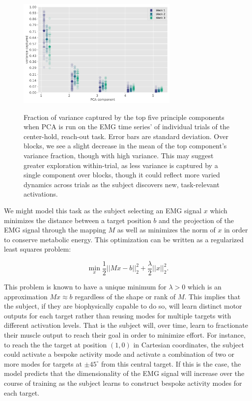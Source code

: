 \begin{figure}
\label{fig:PCA_trial_variance}
\centering
\includegraphics[width=0.7\textwidth,height=\textheight]{images/data_analysis/center_hold/PCA_trial_variance.pdf}
\caption{Fraction of variance captured by the top five principle
components when PCA is run on the EMG time series' of individual trials
of the center-hold, reach-out task. Error bars are standard deviation.
Over blocks, we see a slight decrease in the mean of the top component's
variance fraction, though with high variance. This may suggest greater
exploration within-trial, as less variance is captured by a single
component over blocks, though it could reflect more varied dynamics
across trials as the subject discovers new, task-relevant
activations.}\label{fig:PCA_trial_variance}
\end{figure}

We might model this task as the subject selecting an EMG signal \(x\)
which minimizes the distance between a target position \(b\) and the
projection of the EMG signal through the mapping \(M\) as well as
minimizes the norm of \(x\) in order to conserve metabolic energy. This
optimization can be written as a regularized least squares problem:

\[
\min_x\frac{1}{2}||Mx - b||^2_2 + \frac{\lambda}{2}||x||_2^2.
\]

This problem is known to have a unique minimum for \(\lambda>0\) which
is an approximation \(Mx\approx b\) regardless of the shape or rank of
\(M\). This implies that the subject, if they are biophysically capable
to do so, will learn distinct motor outputs for each target rather than
reusing modes for multiple targets with different activation levels.
That is the subject will, over time, learn to fractionate their muscle
output to reach their goal in order to minimize effort. For instance, to
reach the the target at position \((1,0)\) in Cartesian coordinates, the
subject could activate a bespoke activity mode and activate a
combination of two or more modes for targets at \(\pm45^\circ\) from
this central target. If this is the case, the model predicts that the
dimensionality of the EMG signal will increase over the course of
training as the subject learns to construct bespoke activity modes for
each target.

